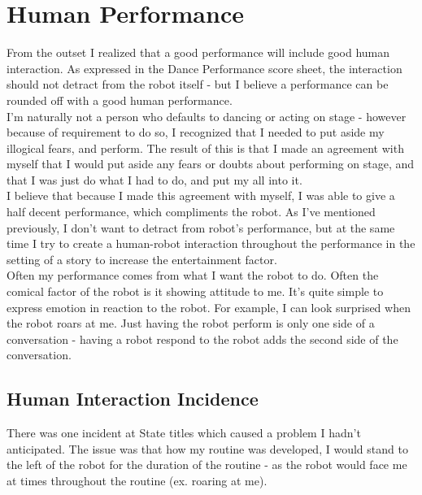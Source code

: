 	\chapter{Human Performance}
    	From the outset I realized that a good performance will include good human interaction. As expressed in the Dance Performance score sheet, the interaction should not detract from the robot itself - but I believe a performance can be rounded off with a good human performance.\\
        
        I'm naturally not a person who defaults to dancing or acting on stage - however because of requirement to do so, I recognized that I needed to put aside my illogical fears, and perform. The result of this is that I made an agreement with myself that I would put aside any fears or doubts about performing on stage, and that I was just do what I had to do, and put my all into it.\\
        
        I believe that because I made this agreement with myself, I was able to give a half decent performance, which compliments the robot. As I've mentioned previously, I don't want to detract from robot's performance, but at the same time I try to create a human-robot interaction throughout the performance in the setting of a story to increase the entertainment factor.\\
        
        Often my performance comes from what I want the robot to do. Often the comical factor of the robot is it showing attitude to me. It's quite simple to express emotion in reaction to the robot. For example, I can look surprised when the robot roars at me. Just having the robot perform is only one side of a conversation - having a robot respond to the robot adds the second side of the conversation.\\
        
        \section{Human Interaction Incidence}
        	There was one incident at State titles which caused a problem I hadn't anticipated. The issue was that how my routine was developed, I would stand to the left of the robot for the duration of the routine - as the robot would face me at times throughout the routine (ex. roaring at me).\\
            
